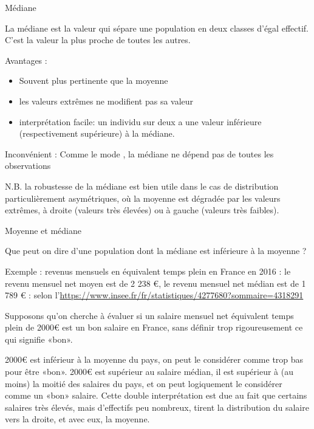 \documentclass{beamer}
\begin{document}
\begin{frame}{Médiane}

La \alert{médiane} est la valeur qui sépare une population en \alert{deux} classes d'égal effectif.\\

C'est la valeur la plus proche de toutes les autres.


\begin{spacing}{0.9}
\begin{small}
Avantages  : 
\begin{itemize}
\item Souvent plus pertinente que la moyenne
\item les valeurs extrêmes ne modifient pas sa valeur
\item interprétation  facile: un individu sur deux a une valeur inférieure (respectivement supérieure) à la médiane.
\end{itemize}
\end{small}
\end{spacing}


Inconvénient : Comme le mode , la médiane ne dépend pas de toutes les observations 

\begin{tiny}
\begin{spacing}{0.9}
\alert{N.B.} la robustesse de la médiane est bien utile dans le cas de distribution particulièrement asymétriques, où la moyenne est dégradée par les valeurs extrêmes, à droite (valeurs très élevées) ou à gauche (valeurs très faibles).
\end{spacing}
\end{tiny}

\end{frame}




\begin{frame}{Moyenne et médiane}

Que peut on dire d'une population dont la médiane est inférieure à la moyenne ? 


Exemple : revenus mensuels en équivalent temps plein en France en 2016 : le revenu mensuel net moyen est de 2 238 €, le revenu mensuel net médian est de 1 789 € : selon l’\url{https://www.insee.fr/fr/statistiques/4277680?sommaire=4318291}

Supposons qu’on cherche à évaluer si un salaire mensuel net équivalent temps plein de 2000€ est un bon salaire en France, sans définir trop rigoureusement ce qui signifie «bon».

2000€ est inférieur à la moyenne du pays, on peut le considérer comme trop bas pour être «bon».
2000€ est supérieur au salaire médian, il est supérieur à (au moins) la moitié des salaires du pays, et on peut logiquement le considérer comme un «bon» salaire.
Cette double interprétation est due au fait que certains salaires très élevés, mais d’effectifs peu nombreux, tirent la distribution du salaire vers la droite, et avec eux, la moyenne.



\end{frame}
\end{document}
